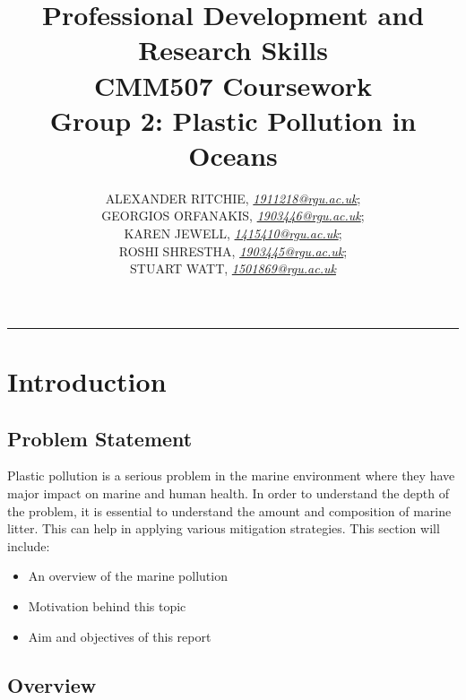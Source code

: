 \documentclass[10pt]{article}\usepackage[]{graphicx}\usepackage[]{color}
\begin{document}
\title{\LARGE Professional Development and Research Skills \\ CMM507 Coursework  \\ Group 2: Plastic Pollution in Oceans}

\author{ALEXANDER RITCHIE, \textit{\href{1911218@rgu.ac.uk}{1911218@rgu.ac.uk}};\\ GEORGIOS ORFANAKIS, \textit{\href{1903446@rgu.ac.uk}{1903446@rgu.ac.uk}};\\ KAREN JEWELL, \textit{\href{1415410@rgu.ac.uk}{1415410@rgu.ac.uk}};\\ ROSHI SHRESTHA, \textit{\href{1903445@rgu.ac.uk}{1903445@rgu.ac.uk}};\\ STUART WATT, \textit{\href{1501869@rgu.ac.uk}{1501869@rgu.ac.uk}}}

\maketitle
\noindent\rule{16cm}{0.4pt}


\section{Introduction}

\subsection{Problem Statement}\label{statement}

Plastic pollution is a serious problem in the marine environment where they have major impact on marine and human health. In order to understand the depth of the problem, it is essential to understand the amount and composition of marine litter. This can help in applying various mitigation strategies. This section will include:
\begin{itemize}
\item An overview of the marine pollution
\item Motivation behind this topic
\item Aim and objectives of this report
\end{itemize}


\subsection{Overview}\label{over}
\end{document}

